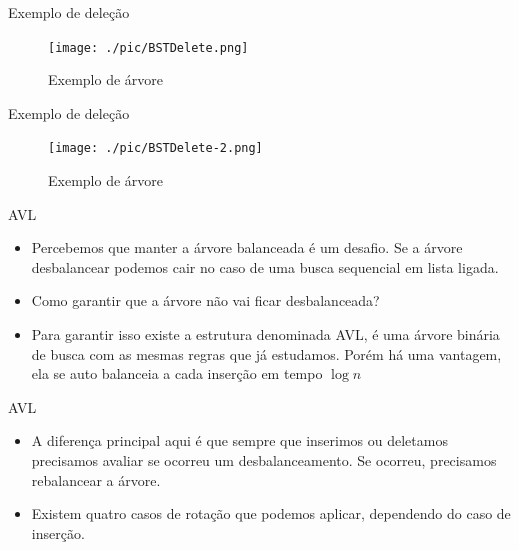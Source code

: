 \begin{frame}
	\begin{block}{Exemplo de deleção}
		\begin{figure}[!htb]
			\centering	  				
			\texttt{[image: ./pic/BSTDelete.png]}
			\caption{Exemplo de árvore}
			\label{fig_pilha}
		\end{figure}
	\end{block}
\end{frame}

\begin{frame}
	\begin{block}{Exemplo de deleção}
		\begin{figure}[!htb]
			\centering	  				
			\texttt{[image: ./pic/BSTDelete-2.png]}
			\caption{Exemplo de árvore}
			\label{fig_pilha}
		\end{figure}
	\end{block}
\end{frame}

\begin{frame}
	\begin{block}{AVL}
		\begin{itemize}
			\item Percebemos que manter a árvore balanceada é um desafio. Se a árvore desbalancear podemos cair no caso de uma busca sequencial em lista ligada.
			
			\item Como garantir que a árvore não vai ficar desbalanceada?
			
			\item Para garantir isso existe a estrutura denominada AVL, é uma árvore binária de busca com as mesmas regras que já estudamos. Porém há uma vantagem, ela se auto balanceia a cada inserção em tempo $\log n$
		\end{itemize}
	\end{block}
\end{frame}


\begin{frame}
	\begin{block}{AVL}
		\begin{itemize}
			\item A diferença principal aqui é que sempre que inserimos ou deletamos precisamos avaliar se ocorreu um desbalanceamento. Se ocorreu, precisamos rebalancear a árvore.

			\item Existem quatro casos de rotação que podemos aplicar, dependendo do caso de inserção.
		\end{itemize}
	\end{block}
\end{frame}

